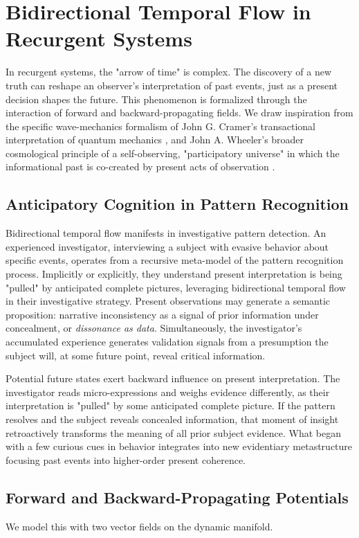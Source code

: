 \section{Bidirectional Temporal Flow in Recurgent Systems}

In recurgent systems, the "arrow of time" is complex. The discovery of a new truth can reshape an observer's interpretation of past events, just as a present decision shapes the future. This phenomenon is formalized through the interaction of forward and backward-propagating fields. We draw inspiration from the specific wave-mechanics formalism of John G. Cramer's transactional interpretation of quantum mechanics \autocite{Cramer1986}, and John A. Wheeler's broader cosmological principle of a self-observing, "participatory universe" in which the informational past is co-created by present acts of observation \autocite{Wheeler1990}.

\subsection{Anticipatory Cognition in Pattern Recognition}

Bidirectional temporal flow manifests in investigative pattern detection. An experienced investigator, interviewing a subject with evasive behavior about specific events, operates from a recursive meta-model of the pattern recognition process. Implicitly or explicitly, they understand present interpretation is being "pulled" by anticipated complete pictures, leveraging bidirectional temporal flow in their investigative strategy. Present observations may generate a semantic proposition: narrative inconsistency as a signal of prior information under concealment, or \textit{dissonance as data}. Simultaneously, the investigator's accumulated experience generates validation signals from a presumption the subject will, at some future point, reveal critical information.

Potential future states exert backward influence on present interpretation. The investigator reads micro-expressions and weighs evidence differently, as their interpretation is "pulled" by some anticipated complete picture. If the pattern resolves and the subject reveals concealed information, that moment of insight retroactively transforms the meaning of all prior subject evidence. What began with a few curious cues in behavior integrates into new evidentiary metastructure focusing past events into higher-order present coherence.

\subsection{Forward and Backward-Propagating Potentials}
We model this with two vector fields on the dynamic manifold.

